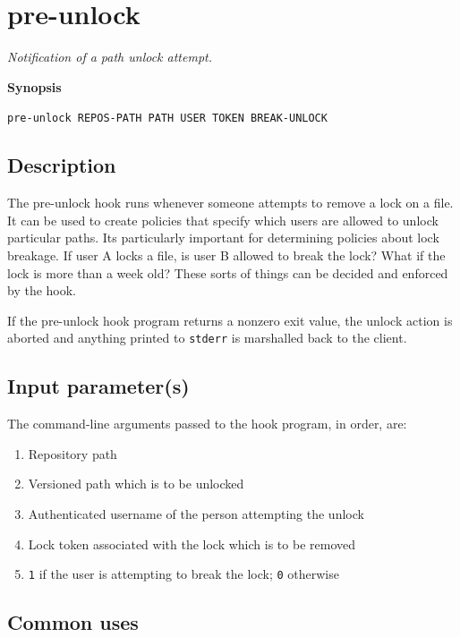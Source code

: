 \section{pre-unlock}\label{svn.ref.reposhooks.pre-unlock}

\emph{Notification of a path unlock attempt.}

\textbf{Synopsis}

\texttt{pre-unlock\ REPOS-PATH\ PATH\ USER\ TOKEN\ BREAK-UNLOCK}

\subsection{Description}

The pre-unlock hook runs whenever someone attempts to remove a lock on a
file. It can be used to create policies that specify which users are
allowed to unlock particular paths. It\textquotesingle s particularly
important for determining policies about lock breakage. If user A locks
a file, is user B allowed to break the lock? What if the lock is more
than a week old? These sorts of things can be decided and enforced by
the hook.

If the pre-unlock hook program returns a nonzero exit value, the unlock
action is aborted and anything printed to \texttt{stderr} is marshalled
back to the client.

\subsection{Input parameter(s)}

The command-line arguments passed to the hook program, in order, are:

\begin{enumerate}
\def\labelenumi{\arabic{enumi}.}
\item
  Repository path
\item
  Versioned path which is to be unlocked
\item
  Authenticated username of the person attempting the unlock
\item
  Lock token associated with the lock which is to be removed
\item
  \texttt{1} if the user is attempting to break the lock; \texttt{0}
  otherwise
\end{enumerate}

\subsection{Common uses}

